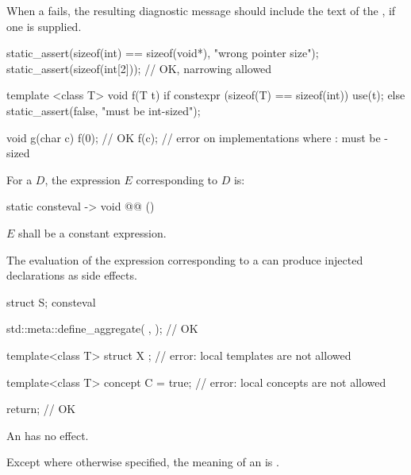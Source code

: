 \pnum
\recommended
When a  fails,
the resulting diagnostic message should include the text of
the , if one is supplied.
\begin{example}
\begin{codeblock}
static_assert(sizeof(int) == sizeof(void*), "wrong pointer size");
static_assert(sizeof(int[2]));          // OK, narrowing allowed

template <class T>
void f(T t) {
  if constexpr (sizeof(T) == sizeof(int)) {
    use(t);
  } else {
    static_assert(false, "must be int-sized");
  }
}

void g(char c) {
  f(0);             // OK
  f(c);             // error on implementations where : must be -sized
}
\end{codeblock}
\end{example}

\pnum
For a  $D$,
the expression $E$ corresponding to $D$ is:
\begin{codeblock}
  [] static consteval -> void @@ ()
\end{codeblock}
$E$ shall be a constant expression.
\begin{note}
The evaluation of the expression
corresponding to a 
can produce injected declarations as side effects.
\end{note}
\begin{example}
\begin{codeblock}
struct S;
consteval {
  std::meta::define_aggregate(^^S, {});     // OK

  template<class T>
  struct X { };                             // error: local templates are not allowed

  template<class T>
  concept C = true;                         // error: local concepts are not allowed

  return;                                   // OK
}
\end{codeblock}
\end{example}

\pnum
An  has no effect.

\pnum
Except where otherwise specified, the meaning of an 
is .

